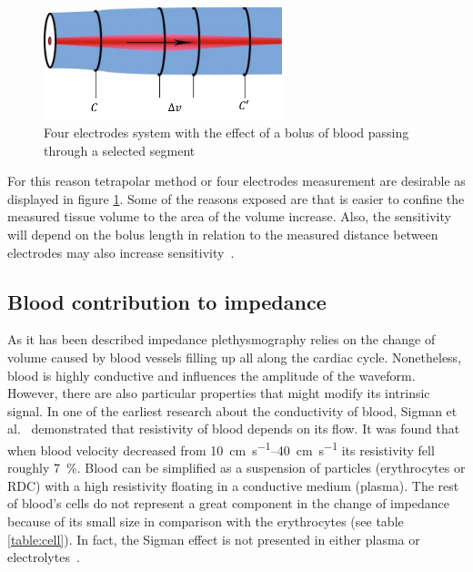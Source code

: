 \begin{figure}[!htpb]
	\centering
	\includegraphics[width=7cm,keepaspectratio]{figure6}    
	\caption[Four electrodes placement for iPG]{Four electrodes system with the effect of a bolus of blood passing through a selected segment}
	\label{fig:cylinder bolus}
\end{figure}

For this reason tetrapolar method or four electrodes measurement are desirable as displayed in figure \ref{fig:cylinder bolus}. Some of the reasons exposed are that is easier to confine the measured tissue volume to the area of the volume increase. Also, the sensitivity will depend on the bolus length in relation to the measured distance between electrodes may also increase sensitivity~\cite{porter1985measurement}.


\subsection{Blood contribution to impedance} %
As it has been described impedance plethysmography relies on the change of volume caused by blood vessels filling up all along the cardiac cycle. Nonetheless, blood is highly conductive and influences the amplitude of the waveform. However, there are also particular properties that might modify its intrinsic signal. In one of the earliest research about the conductivity of blood, Sigman et al.~\cite{sigman1937effect}  demonstrated that resistivity of blood depends on its flow.  It was found that when blood velocity decreased from \SIrange{10}{40}{\centi\meter\per\second} its resistivity fell roughly \SI{7}{\percent}. Blood can be simplified as a suspension of particles (erythrocytes or RDC) with a high resistivity floating in a conductive medium (plasma). The rest of blood’s cells do not represent a great component in the change of impedance because of its small size in comparison with the erythrocytes (see table \ref{table:cell}). In fact, the Sigman effect is not presented in either plasma or electrolytes~\cite{tremper1990principles}.  

